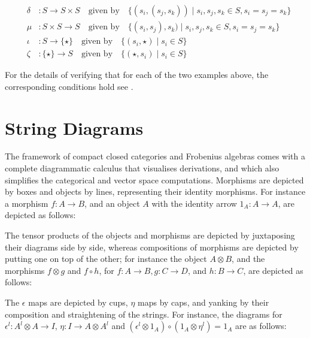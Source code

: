 \begin{eqnarray*}
&\delta &\colon   S \to S \times S \quad \mbox{given by} \quad
\{(s_i, (s_j, s_k)) \mid s_i, s_j, s_k \in S, s_i = s_j  = s_k\}\\
& \mu & \colon   S \times S \to S
\quad \mbox{given by} \quad 
\{(s_i, s_j), s_k) \mid s_i, s_j, s_k\in S, s_i = s_j= s_k\}\\
& \iota& \colon S \to  \{\star\}    \quad \mbox{given by} \quad \{(s_i, \star) \mid s_i \in S\}\\
&\zeta& \colon  \{\star\}  \to S  \quad \mbox{given by} \quad \{(\star, s_i) \mid s_i \in S\}
\end{eqnarray*}

For the details of verifying that for each of the two examples above,  the corresponding conditions hold see \cite{CoeckePaq}. 

\section{String Diagrams} 
\label{string}

The framework of compact closed categories and Frobenius algebras
comes with a complete diagrammatic calculus that visualises
derivations, and which also simplifies the
categorical and vector space computations. Morphisms are depicted by
boxes and objects by lines, representing their identity morphisms. For
instance a morphism $f \colon A \to B$, and an object $A$ with the
identity arrow $1_A \colon A \to A$, are depicted as follows:

\begin{center}
\end{center}

The tensor products of the objects and morphisms are depicted by
juxtaposing their diagrams side by side, whereas compositions of
morphisms are depicted by putting one on top of the other; for instance
the object $A \otimes B$, and the morphisms $f \otimes g$ and $f \circ
h$, for $f \colon A \to B, g \colon C \to D$, and $h \colon B \to C$,
are depicted as follows:

\begin{center}
\end{center}

The $\epsilon$ maps are depicted by cups, $\eta$ maps by caps, and
yanking by their composition and straightening of the strings.  For
instance, the diagrams for $\epsilon^l \colon A^l \otimes A \to I$,
$\eta \colon I \to A\otimes A^l$ and $(\epsilon^l \otimes 1_A) \circ
(1_A \otimes \eta^l) = 1_A$ are as follows:

